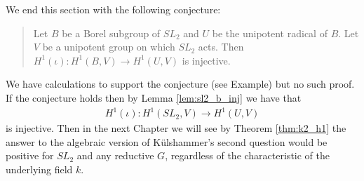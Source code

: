 We end this section with the following conjecture:
\begin{quote}
Let $B$ be a Borel subgroup of $SL_2$ and $U$ be the unipotent radical of $B$. Let $V$ be a unipotent group on which $SL_2$ acts. Then $H^1(\iota):H^1(B, V)\rightarrow H^1(U, V)$ is injective.
\end{quote}
We have calculations to support the conjecture (see Example) but no such proof. If the conjecture holds then by Lemma \ref{lem:sl2_b_inj} we have that
\begin{align}
	H^1(\iota): H^1(SL_2, V)\rightarrow H^1(U, V)
\end{align}
is injective.
Then in the next Chapter we will see by Theorem \ref{thm:k2_h1} the answer to the algebraic version of K\"ulshammer's second question would be positive for $SL_2$ and any reductive $G$, regardless of the characteristic of the underlying field $k$.

